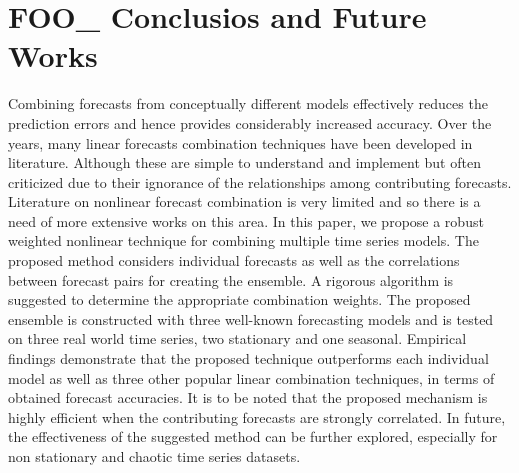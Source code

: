 \section{FOO_ Conclusios and Future Works}


Combining forecasts from conceptually different models effectively reduces the prediction errors and hence provides
considerably increased accuracy. Over the years, many linear forecasts combination techniques have been developed in literature. Although these are simple to understand and implement but often criticized due to their ignorance of the relationships among contributing forecasts. Literature on nonlinear forecast combination is very limited and so there is a need of more extensive works on this area. In this paper, we propose a robust weighted nonlinear
technique for combining multiple time series models. The proposed method considers individual forecasts as well as the correlations between forecast pairs for creating the ensemble. A rigorous algorithm is suggested to determine the appropriate combination weights. The proposed ensemble is constructed with three well-known forecasting models and is tested on three real world time series, two stationary and one seasonal. Empirical findings demonstrate that the proposed technique outperforms each individual model as well as three other popular linear combination techniques, in terms of obtained forecast accuracies. It is to be noted that the proposed mechanism is highly efficient when the contributing forecasts are strongly correlated. In future, the effectiveness of the suggested method can be further explored, especially for non stationary and chaotic time series datasets. 
